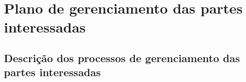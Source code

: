 
\chapter{Plano de gerenciamento das partes interessadas}

\section{Descrição dos processos de gerenciamento das partes interessadas}


